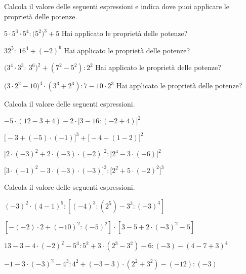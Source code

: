 \begin{esercizio}[\Ast]
Calcola il valore delle seguenti espressioni e indica dove puoi applicare le 
proprietà delle potenze.
\TabPositions{5.5cm}
\begin{enumeratea}
 \item \(5\cdot 5^3\cdot 5^4: \big(5^2\big)^3 +5\) \tab Hai applicato le proprietà 
delle potenze?\enspace\dotfill
 \item \(32^5:~16^4 +(-2)^9\) \tab Hai applicato le proprietà delle 
potenze?\enspace\dotfill
 \item \(\big(3^4\cdot 3^3:~3^6\big)^2 +(7^2-5^2):2^2\) \tab Hai applicato le 
proprietà delle potenze?\enspace\dotfill
 \item \(\big(3\cdot 2^2 -10\big)^4\cdot (3^3+2^3):7-10\cdot 2^3\) \tab Hai 
applicato le proprietà delle potenze?\enspace\dotfill
\end{enumeratea}
\end{esercizio}

\begin{esercizio}[\Ast]
Calcola il valore delle seguenti espressioni.
 \begin{enumeratea}
 \item \(-5\cdot(12-3+4)-2\cdot\big[3-16:(-2+4)\big]^2\)
 \item \(\big[-3+(-5)\cdot(-1)\big]^3+\big[-4-(1-2)\big]^2\)
 \item \(\big[2\cdot(-3)^2+2\cdot(-3)\cdot(-2)\big]^2:\big[2^4-3\cdot(+6)\big]^2\)
 \item 
\(\big[3\cdot(-1)^2-3\cdot(-3)\cdot(-3)\big]^3:\big[2^2+5\cdot(-2)^2\big]^3\)
 \end{enumeratea}
\end{esercizio}

\begin{esercizio}[\Ast]
Calcola il valore delle seguenti espressioni.
 \begin{enumeratea}
 \item \((-3)^2\cdot(4-1)^5:[(-4)^3:(2^5)-3^3:(-3)^3]\)
 \item \([-(-2)\cdot2+(-10)^2:(-5)^2]\cdot[3-5+2\cdot(-3)^2-5]\)
 \item \(13-3-4\cdot(-2)^2-5^3:5^2+3\cdot(2^3-3^2)-6:(-3)-(4-7+3)^4\)
 \item \(-1-3\cdot(-3)^2-4^3:4^2+(-3-3)\cdot(2^2+3^2)-(-12):(-3)\)
 \end{enumeratea}
\end{esercizio}

